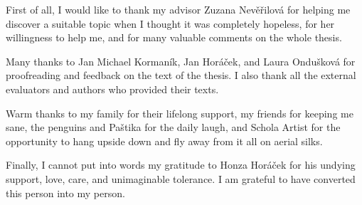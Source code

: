 First of all, I would like to thank my advisor Zuzana Nevěřilová for helping me discover a suitable topic when I thought it was completely hopeless, for her willingness to help me, and for many valuable comments on the whole thesis.

Many thanks to Jan Michael Kormaník, Jan Horáček, and Laura Ondušková for proofreading and feedback on the text of the thesis. I also thank all the external evaluators and authors who provided their texts.

Warm thanks to my family for their lifelong support, my friends for keeping me sane, the penguins and Paštika for the daily laugh, and Schola Artist for the opportunity to hang upside down and fly away from it all on aerial silks.

Finally, I cannot put into words my gratitude to Honza Horáček for his undying support, love, care, and unimaginable tolerance. I am grateful to have converted this person into my person.
